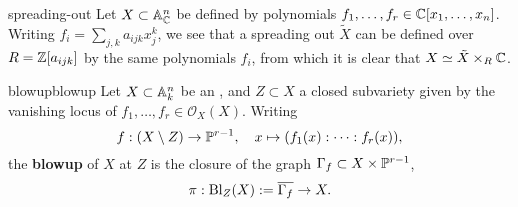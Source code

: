 \begin{example}{spreading-out}
    Let $X \subset \AA^n_\CC$ be defined by polynomials $f_1, \ldots, f_r \in \CC[x_1, \ldots, x_n]$. Writing $f_i = \sum_{j, k} a_{ijk} x_j^k$, we see that a spreading out $\tilde{X}$ can be defined over $R = \ZZ[a_{ijk}]$ by the same polynomials $f_i$, from which it is clear that $X \simeq \tilde{X} \times_R \CC$.
\end{example}


\begin{topic}{blowup}{blowup}
    Let $X \subset \AA^n_k$ be an , and $Z \subset X$ a closed subvariety given by the vanishing locus of $f_1, \ldots, f_r \in \mathcal{O}_X(X)$. Writing
    \[ f : (X \setminus Z) \to \PP^{r - 1}, \quad x \mapsto (f_1(x) : \cdots : f_r(x)) , \]
    the \textbf{blowup} of $X$ at $Z$ is the closure of the graph $\Gamma_f \subset X \times \PP^{r - 1}$,
    \[ \pi : \textup{Bl}_Z(X) := \overline{\Gamma_f} \to X . \]
\end{topic}

